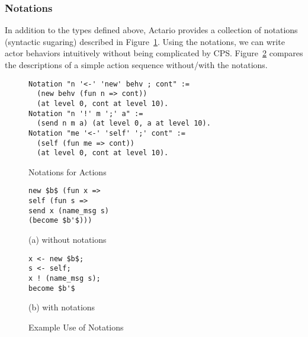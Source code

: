 \subsubsection{Notations}

In addition to the types defined above, Actario provides a collection
of notations (syntactic sugaring) described in
Figure~\ref{coq:notation}.  Using the notations, we can write actor
behaviors intuitively without being complicated by CPS.
Figure~\ref{fig:notationexample} compares the descriptions of a simple
action sequence without/with the notations.

\begin{figure}
\begin{lstlisting}
Notation "n '<-' 'new' behv ; cont" :=
  (new behv (fun n => cont))
  (at level 0, cont at level 10).
Notation "n '!' m ';' a" :=
  (send n m a) (at level 0, a at level 10).
Notation "me '<-' 'self' ';' cont" :=
  (self (fun me => cont))
  (at level 0, cont at level 10).
\end{lstlisting}
\caption{Notations for Actions}\label{coq:notation}
\end{figure}

\begin{figure}\centering
\begin{minipage}{0.2\textwidth}\centering
\begin{lstlisting}[frame=single,numbers=none,xleftmargin=0pt]
new $b$ (fun x =>
self (fun s =>
send x (name_msg s)
(become $b'$)))
\end{lstlisting}
(a) without notations
\end{minipage}
\hspace*{3ex}
\begin{minipage}{0.2\textwidth}\centering
\begin{lstlisting}[frame=single,numbers=none,xleftmargin=0pt]
x <- new $b$;
s <- self;
x ! (name_msg s);
become $b'$
\end{lstlisting}
(b) with notations
\end{minipage}
\caption{Example Use of Notations}\label{fig:notationexample}
\end{figure}
